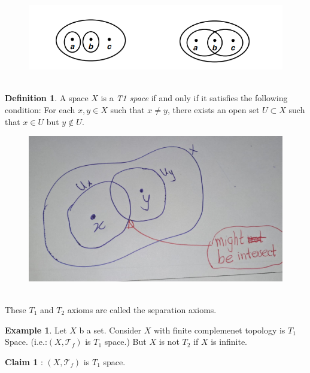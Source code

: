 \documentclass[
]{book}
\theoremstyle{definition}
\newtheorem{definition}{Definition}[chapter]
\theoremstyle{definition}
\newtheorem{example}{Example}[chapter]
\theoremstyle{definition}
\theoremstyle{definition}
\theoremstyle{remark}
\begin{document}
\begin{figure}
\centering
\includegraphics{figures/figure 02.png}
\caption{\label{fig:fig02}\(~\)}
\end{figure}

\begin{definition}
\protect\hypertarget{def:unnamed-chunk-77}{}\label{def:unnamed-chunk-77}A space \(X\) is a \emph{T1 space} if and only if it satisfies the following condition: For each \(x, y \in X\) such that \(x \neq y\), there exists an open set \(U \subset X\) such that \(x \in U\) but \(y \notin U\).
\end{definition}

\begin{figure}
\centering
\includegraphics{figures/figure 17.jpg}
\caption{\label{fig:fig17}\(~\)}
\end{figure}

These \(T_1\) and \(T_2\) axioms are called the separation axioms.

\begin{example}
\protect\hypertarget{exm:unnamed-chunk-78}{}\label{exm:unnamed-chunk-78}Let \(X\) b a set. Consider \(X\) with finite complemenet topology is \(T_1\) Space. (i.e.:\((X,\mathcal{T}_f)\) is \(T_1\) space.) But \(X\) is not \(T_2\) if \(X\) is infinite.
\end{example}

\textbf{Claim 1} : \((X,\mathcal{T}_{f})\) is \(T_1\) space.
\end{document}
